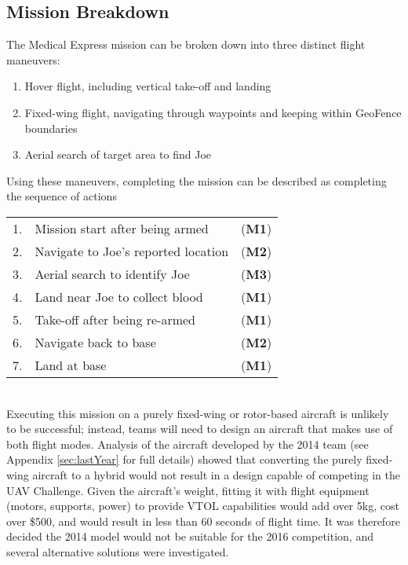 \subsection{Mission Breakdown}
\label{sec:flightmaneuvers}
The Medical Express mission can be broken down into three distinct flight maneuvers:
\begin{enumerate}[label=\bfseries M\arabic*:] \itemsep-2pt
	\item Hover flight, including vertical take-off and landing
	\item Fixed-wing flight, navigating through waypoints and keeping within GeoFence boundaries
	\item Aerial search of target area to find Joe
\end{enumerate}

Using these maneuvers, completing the mission can be described as completing the sequence of actions\\
\begin{tabular}{r l l}
	1. & Mission start after being armed & (\textbf{M1}) \\ 
	2. & Navigate to Joe's reported location & (\textbf{M2}) \\ 
	3. & Aerial search to identify Joe & (\textbf{M3}) \\ 
	4. & Land near Joe to collect blood & (\textbf{M1}) \\ 
	5. & Take-off after being re-armed & (\textbf{M1}) \\ 
	6. & Navigate back to base & (\textbf{M2}) \\ 
	7. & Land at base & (\textbf{M1}) \\ 
\end{tabular}\\

Executing this mission on a purely fixed-wing or rotor-based aircraft is unlikely to be successful; instead, teams will need to design an aircraft that makes use of both flight modes. Analysis of the aircraft developed by the 2014 team (see Appendix \ref{sec:lastYear} for full details) showed that converting the purely fixed-wing aircraft to a hybrid would not result in a design capable of competing in the UAV Challenge. Given the aircraft's weight, fitting it with flight equipment (motors, supports, power) to provide VTOL capabilities would add over 5kg, cost over \$500, and would result in less than 60 seconds of flight time. It was therefore decided the 2014 model would not be suitable for the 2016 competition, and several alternative solutions were investigated.\\

